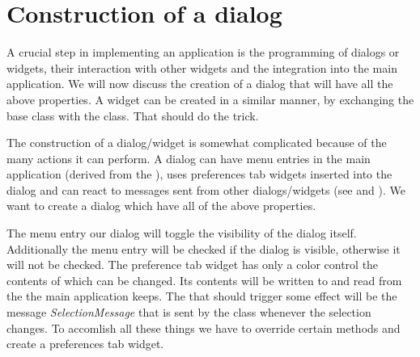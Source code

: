\section{Construction of a dialog}
\label{section:view_construction_of_a_dialog}

A crucial step in implementing an application is the programming of dialogs or
widgets, their interaction with other widgets and the integration into the
main application. We will now discuss the creation of a dialog that will have
all the above properties. A widget can be created in a similar manner, by
exchanging the  base class with the  class. That
should do the trick.

The construction of a dialog/widget is somewhat complicated because of the
many actions it can perform. A dialog can have menu entries in the main
application (derived from the ), uses preferences tab
widgets inserted into the  dialog and can react to messages
sent from other dialogs/widgets (see  and
). We want to create a dialog which have all of the
above properties.

The menu entry our dialog will toggle the visibility of the dialog itself.
Additionally the menu entry will be checked if the dialog is visible,
otherwise it will not be checked. The preference tab widget has only a color
control the contents of which can be changed. Its contents will be written to
and read from the  the main application keeps. The
 that should trigger some effect will be the message {\em
SelectionMessage} that is sent by the class  whenever the
selection changes. To accomlish all these things we have to override certain
methods and create a preferences tab widget.

